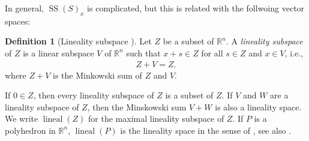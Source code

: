 \documentclass[a4paper,dvipdfmx,reqno,12pt]{amsart}
\theoremstyle{definition}
\newtheorem{definition}[theorem]{Definition}
\newcommand{\opn}[1]{\operatorname{#1}}
\numberwithin{equation}{section}
\begin{document}
In general, $\opn{SS}(S)_x$  
is complicated, but this is related with the 
follwoing vector 
spaces:

\begin{definition}[{Lineality subspace 
\cite[]{MR4246795}}]
Let $Z$ be a subset of
$\mathbb{R}^{n}$. A \emph{lineality subspace} of $Z$ is 
a linear subspace $V$ of
$\mathbb{R}^{n}$ such that $x+s\in Z$ for all 
$s\in Z$ and $x\in V$, i.e.,
\begin{align}
Z+V=Z.
\end{align}
where $Z+V$ is the Minkowski sum of $Z$ and $V$.
\end{definition}
If $0\in Z$, then 
every lineality subspace of $Z$ is a subset of $Z$.
If $V$ and $W$ are a lineality subspace of $Z$, 
then the Minskowski sum $V+W$ is 
also a lineality space.
We write $\opn{lineal}(Z)$ for the maximal lineality 
subspace of $Z$. If $P$ is a polyhedron in 
$\mathbb{R}^{n}$, $\opn{lineal}(P)$ is the lineality space
in the sense of \cite[p.60]{MR3287221}, see also 
\cite[]{MR3041763}.
\end{document}
